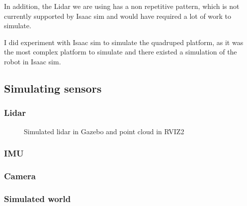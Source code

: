 \documentclass[11pt]{article}
\begin{document}
                In addition, the Lidar we are using has a non repetitive pattern, which is not currently supported by Isaac sim and would have required a lot of work to simulate.

                I did experiment with Isaac sim to simulate the quadruped platform, as it was the most complex platform to simulate and there existed a simulation of the robot in Isaac sim.
        \subsection{Simulating sensors}
            \subsubsection{Lidar}

            \begin{figure}[H]
                \centering
                \caption{Simulated lidar in Gazebo and point cloud in RVIZ2}
            \end{figure}

            \subsubsection{IMU}
            \subsubsection{Camera}
        \subsubsection{Simulated world}
\end{document}
